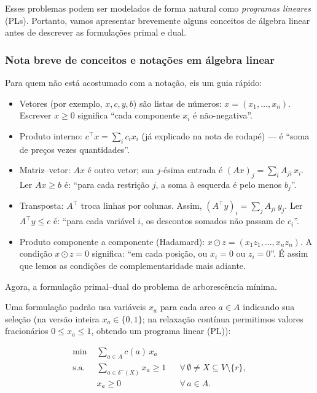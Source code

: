 Esses problemas podem ser modelados de forma natural como \emph{programas lineares} (PLs). Portanto, vamos apresentar brevemente alguns conceitos de álgebra linear antes de descrever as formulações primal e dual.

\subsubsection{Nota breve de conceitos e notações em álgebra linear}


Para quem não está acostumado com a notação, eis um guia rápido:
\begin{itemize}\setlength{\itemsep}{1pt}
	\item Vetores (por exemplo, \(x, c, y, b\)) são listas de números: \(x=(x_1,\dots,x_n)\). Escrever \(x\ge 0\) significa “cada componente \(x_i\) é não-negativa”.
	\item Produto interno: \(c^\top x=\sum_i c_i x_i\) (já explicado na nota de rodapé) — é “soma de preços vezes quantidades”.
	\item Matriz–vetor: \(Ax\) é outro vetor; sua \(j\)-ésima entrada é \((Ax)_j=\sum_i A_{j i}\,x_i\). Ler \(Ax\ge b\) é: “para cada restrição \(j\), a soma à esquerda é pelo menos \(b_j\)”.
	\item Transposta: \(A^\top\) troca linhas por colunas. Assim, \((A^\top y)_i=\sum_j A_{j i}\,y_j\). Ler \(A^\top y\le c\) é: “para cada variável \(i\), os descontos somados não passam de \(c_i\)”.
	\item Produto componente a componente (Hadamard): \(x\odot z=(x_1 z_1,\dots,x_n z_n)\). A condição \(x\odot z=0\) significa: “em cada posição, ou \(x_i=0\) ou \(z_i=0\)”. É assim que lemos as condições de complementaridade mais adiante.
\end{itemize}


Agora, a formulação primal–dual do problema de arborescência mínima.


Uma formulação padrão usa variáveis \(x_a\) para cada arco \(a\in A\) indicando sua seleção (na versão inteira \(x_a\in\{0,1\}\); na relaxação contínua permitimos valores fracionários \(0\le x_a\le 1\), obtendo um programa linear (PL)):

\[
	\begin{aligned}
		\min\          & \sum_{a\in A} c(a)\,x_a                                                                  \\[4pt]
		\text{s.a. }\  & \sum_{a\in\delta^-(X)} x_a \ge 1 &  & \forall\,\emptyset\neq X\subseteq V\setminus\{r\}, \\[4pt]
		               & x_a \ge 0                        &  & \forall\,a\in A.
	\end{aligned}
\]

